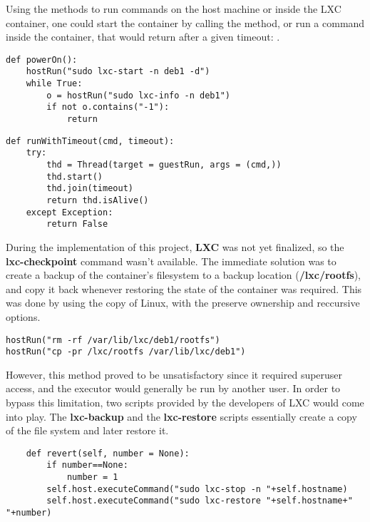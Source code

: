 Using the methods to run commands on the host machine or inside the 
LXC container, one could start the container by calling the 
 method, or run a command inside the container,
that would return after a given timeout: .

\lstset{caption=Method Called to Power on the Container,language=python,label=lst:lxc-poweron}
\begin{lstlisting}
def powerOn():
    hostRun("sudo lxc-start -n deb1 -d")
    while True:
        o = hostRun("sudo lxc-info -n deb1")
        if not o.contains("-1"):
            return
\end{lstlisting}


\lstset{caption=Method That Runs a Command Inside the Container,language=python,label=lst:lxc-runtimeout}
\begin{lstlisting}
def runWithTimeout(cmd, timeout):
    try:
        thd = Thread(target = guestRun, args = (cmd,))
        thd.start()
        thd.join(timeout)
        return thd.isAlive()
    except Exception:
        return False
\end{lstlisting}

During the implementation of this project, \textbf{LXC} was not yet finalized,
so the \textbf{lxc-checkpoint} command wasn't available. 
The immediate solution was to create a backup of the container's filesystem to a 
backup location (\textbf{/lxc/rootfs}), and copy it back whenever 
restoring the state of the container was required. This was done by using the
copy  of Linux, with the preserve ownership and
reccursive options.

\lstset{caption=Restoring the Contaier to a Previous State, language=python, label=lst:lxc-restore}
\begin{lstlisting}
hostRun("rm -rf /var/lib/lxc/deb1/rootfs")
hostRun("cp -pr /lxc/rootfs /var/lib/lxc/deb1")
\end{lstlisting}

However, this method proved to be unsatisfactory since it required superuser access, and
the executor would generally be run by another user. In order to bypass this limitation,
two scripts provided by the developers of LXC would come into play. 
The \textbf{lxc-backup} and the \textbf{lxc-restore} scripts essentially create a
copy of the file system and later restore it.

\lstset{caption=Restoring the Container to a Previous State, language=python, label=lst:lxc-revert}
\begin{lstlisting}
    def revert(self, number = None):
        if number==None:
            number = 1
        self.host.executeCommand("sudo lxc-stop -n "+self.hostname)
        self.host.executeCommand("sudo lxc-restore "+self.hostname+" "+number)
\end{lstlisting}

